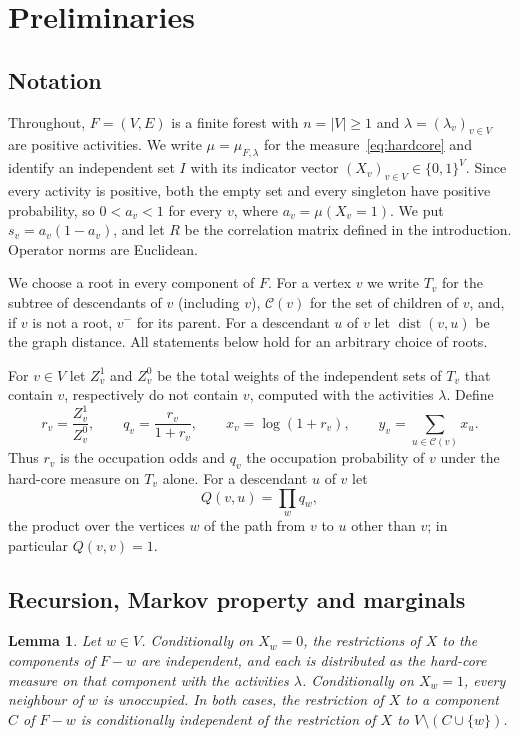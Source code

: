 \documentclass{amsart}
\numberwithin{equation}{section}
\numberwithin{table}{section}
\newtheorem{lemma}[theorem]{Lemma}
\theoremstyle{definition}
\theoremstyle{remark}
\newcommand{\dist}{\operatorname{dist}}
\newcommand{\Ch}{\mathcal{C}}
\begin{document}
\section{Preliminaries}\label{sec:prelim}

\subsection{Notation}
Throughout, $F=(V,E)$ is a finite forest with $n=|V|\ge1$ and $\lambda=(\lambda_v)_{v\in V}$ are positive activities. We write $\mu=\mu_{F,\lambda}$ for the measure~\eqref{eq:hardcore} and identify an independent set $I$ with its indicator vector $(X_v)_{v\in V}\in\{0,1\}^V$. Since every activity is positive, both the empty set and every singleton have positive probability, so $0<a_v<1$ for every $v$, where $a_v=\mu(X_v=1)$. We put $s_v=a_v(1-a_v)$, and let $R$ be the correlation matrix defined in the introduction. Operator norms are Euclidean.

We choose a root in every component of $F$. For a vertex $v$ we write $T_v$ for the subtree of descendants of $v$ (including $v$), $\Ch(v)$ for the set of children of $v$, and, if $v$ is not a root, $v^-$ for its parent. For a descendant $u$ of $v$ let $\dist(v,u)$ be the graph distance. All statements below hold for an arbitrary choice of roots.

For $v\in V$ let $Z^1_v$ and $Z^0_v$ be the total weights of the independent sets of $T_v$ that contain $v$, respectively do not contain $v$, computed with the activities $\lambda$. Define
\begin{equation}\label{eq:messages}
r_v=\frac{Z_v^1}{Z_v^0},\qquad q_v=\frac{r_v}{1+r_v},\qquad x_v=\log(1+r_v),\qquad y_v=\sum_{u\in\Ch(v)}x_u .
\end{equation}
Thus $r_v$ is the occupation odds and $q_v$ the occupation probability of $v$ under the hard-core measure on $T_v$ alone. For a descendant $u$ of $v$ let
\[
Q(v,u)=\prod_{w}q_w,
\]
the product over the vertices $w$ of the path from $v$ to $u$ other than $v$; in particular $Q(v,v)=1$.

\subsection{Recursion, Markov property and marginals}

\begin{lemma}\label{lem:markov}
Let $w\in V$. Conditionally on $X_w=0$, the restrictions of $X$ to the components of $F-w$ are independent, and each is distributed as the hard-core measure on that component with the activities $\lambda$. Conditionally on $X_w=1$, every neighbour of $w$ is unoccupied. In both cases, the restriction of $X$ to a component $C$ of $F-w$ is conditionally independent of the restriction of $X$ to $V\setminus(C\cup\{w\})$.
\end{lemma}
\end{document}

